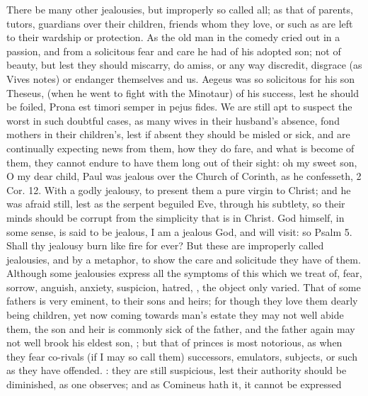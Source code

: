 There be many other jealousies, but improperly so called all; as that
of parents, tutors, guardians over their children, friends whom they
love, or such as are left to their wardship or protection.
%
%
As the old man in the comedy cried out in a passion, and from a
solicitous fear and care he had of his adopted son; not of
beauty, but lest they should miscarry, do amiss, or any way discredit,
disgrace (as Vives notes) or endanger themselves and us. Aegeus
was so solicitous for his son Theseus, (when he went to fight with the
Minotaur) of his success, lest he should be foiled, Prona est
timori semper in pejus fides. We are still apt to suspect the worst in
such doubtful cases, as many wives in their husband's absence, fond
mothers in their children's, lest if absent they should be misled or
sick, and are continually expecting news from them, how they do fare,
and what is become of them, they cannot endure to have them long out of
their sight: oh my sweet son, O my dear child, \etc{} Paul was jealous
over the Church of Corinth, as he confesseth, 2 Cor.  12. With a
godly jealousy, to present them a pure virgin to Christ; and he was
afraid still, lest as the serpent beguiled Eve, through his subtlety,
so their minds should be corrupt from the simplicity that is in Christ.
God himself, in some sense, is said to be jealous, I am a jealous
God, and will visit: so Psalm  5. Shall thy jealousy burn like
fire for ever? But these are improperly called jealousies, and by a
metaphor, to show the care and solicitude they have of them. Although
some jealousies express all the symptoms of this which we treat of,
fear, sorrow, anguish, anxiety, suspicion, hatred, \etc{}, the object only
varied. That of some fathers is very eminent, to their sons and heirs;
for though they love them dearly being children, yet now coming towards
man's estate they may not well abide them, the son and heir is commonly
sick of the father, and the father again may not well brook his eldest
son, ; but that
of princes is most notorious, as when they fear co-rivals (if I may so
call them) successors, emulators, subjects, or such as they have
offended. : they are
still suspicious, lest their authority should be diminished, as
one observes; and as Comineus hath it, it cannot be expressed
